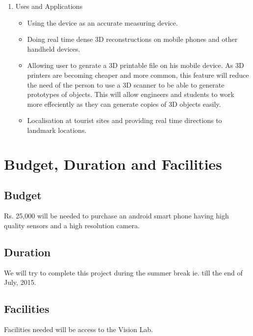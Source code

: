 \documentclass{article}
\begin{document}
\begin{enumerate}
			\item Uses and Applications
			\begin{itemize}
				\item Using the device as an accurate measuring device.
				\item Doing real time dense 3D reconstructions on mobile phones and other handheld devices. 
				\item Allowing user to genrate a 3D printable file on his mobile device. As 3D printers are becoming cheaper and more common, this feature will reduce the need of the person to use a 3D scanner to be able to generate prototypes of objects. This will allow engineers and students to work more effeciently as they can generate copies of 3D objects easily.  
				\item Localisation at tourist sites and providing real time directions to landmark locations. 
			\end{itemize}
		\end{enumerate}
	\section{Budget, Duration and Facilities}	
		\subsection{Budget}
			Rs. 25,000 will be needed to purchase an android smart phone having high quality sensors and a high resolution camera.
		\subsection{Duration}
			We will try to complete this project during the summer break ie. till the end of July, 2015. 
		\subsection{Facilities}
			Facilities needed will be access to the Vision Lab.
\end{document}
